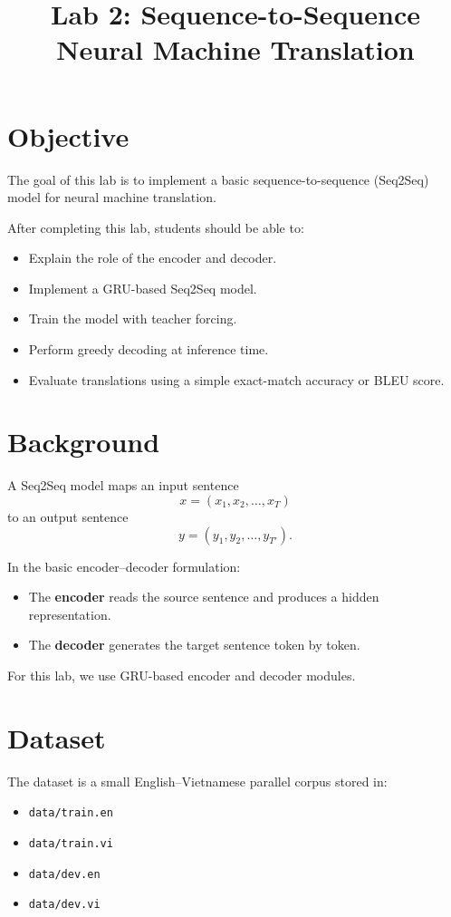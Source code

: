 \documentclass[12pt]{article}
\title{Lab 2: Sequence-to-Sequence Neural Machine Translation}
\author{}
\date{}
\begin{document}
\maketitle

\section{Objective}
The goal of this lab is to implement a basic sequence-to-sequence (Seq2Seq)
model for neural machine translation.

After completing this lab, students should be able to:
\begin{itemize}
    \item Explain the role of the encoder and decoder.
    \item Implement a GRU-based Seq2Seq model.
    \item Train the model with teacher forcing.
    \item Perform greedy decoding at inference time.
    \item Evaluate translations using a simple exact-match accuracy or BLEU score.
\end{itemize}

\section{Background}
A Seq2Seq model maps an input sentence
\[
x = (x_1, x_2, \dots, x_T)
\]
to an output sentence
\[
y = (y_1, y_2, \dots, y_{T'}).
\]

In the basic encoder--decoder formulation:
\begin{itemize}
    \item The \textbf{encoder} reads the source sentence and produces a hidden representation.
    \item The \textbf{decoder} generates the target sentence token by token.
\end{itemize}

For this lab, we use GRU-based encoder and decoder modules.

\section{Dataset}
The dataset is a small English--Vietnamese parallel corpus stored in:
\begin{itemize}
    \item \texttt{data/train.en}
    \item \texttt{data/train.vi}
    \item \texttt{data/dev.en}
    \item \texttt{data/dev.vi}
\end{itemize}
\end{document}
